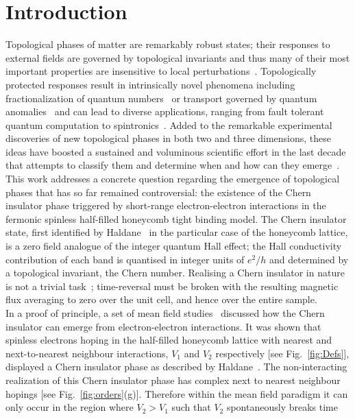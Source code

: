 \documentclass[aps,prx,10pt,twocolumn,floatfix,superscriptaddress,showpacs,numerical,footinbib]{revtex4-1}
\begin{document}
\section{Introduction}
%
Topological phases of matter are remarkably robust states; their responses to external fields are
governed by topological invariants and thus many of their most important properties are insensitive to local perturbations~\cite{HK10,QZ11}.
%
Topologically protected responses result in intrinsically novel phenomena
including fractionalization of quantum numbers~\cite{Nayak2008} or transport governed by quantum anomalies~\cite{V03}
and can lead to diverse applications, ranging from fault tolerant quantum computation to spintronics~\cite{HK10,QZ11,Nayak2008}.
%
Added to the remarkable experimental discoveries of new topological phases in both two and three dimensions,
these ideas have boosted a sustained and voluminous scientific effort in the last decade that attempts to classify them 
and determine when and how can they emerge~\cite{S14}.\\
%
This work addresses a concrete question regarding the emergence of topological phases that has so far remained controversial: 
the existence of the Chern insulator phase triggered by short-range electron-electron interactions in the
fermonic spinless half-filled honeycomb tight binding model.
%
The Chern insulator state, first identified by Haldane~\cite{H88} in the particular case of the honeycomb lattice, is a zero field analogue of the
integer quantum Hall effect; the Hall conductivity contribution of each band is quantised in integer units of $e^2/h$ and determined by a topological invariant, the Chern number.
%
Realising a Chern insulator in nature is not a trivial task~\cite{CZF13}; time-reversal must be broken with
the resulting magnetic flux averaging to zero over the unit cell, and hence over the entire sample.\\
%
In a proof of principle, a set of mean field studies~\cite{RQHZ08,WF10,GCC13} 
discussed how the Chern insulator can emerge from electron-electron interactions. 
%
It was shown that spinless electrons hoping in the half-filled honeycomb lattice with nearest and next-to-nearest neighbour interactions, $V_{1}$ and $V_{2}$ respectively 
[see Fig.~\ref{fig:Defs}], displayed a Chern insulator phase as described by Haldane~\cite{H88}.
%
The non-interacting realization of this Chern insulator phase has complex next to nearest neighbour hopings [see Fig.~\ref{fig:orders}(g)].
%
Therefore within the mean field paradigm it can only occur in the region where $V_{2}>V_{1}$ such that $V_{2}$ spontaneously breaks time
\end{document}
